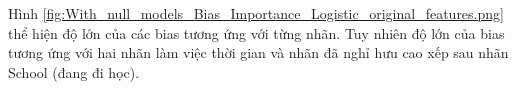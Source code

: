 \begin{enumerate}[label=(\alph*)]
    Hình \ref{fig:With_null_models_Bias_Importance_Logistic_original_features.png} thể hiện độ lớn của các bias tương ứng với từng nhãn.
    Tuy nhiên độ lớn của bias tương ứng với hai nhãn làm việc thời gian và nhãn đã nghỉ hưu cao xếp sau nhãn School (đang đi học).
\end{enumerate}
